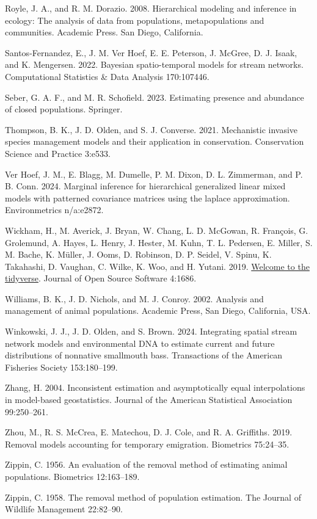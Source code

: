 \documentclass[
  11pt,
  a4paper,
]{article}
\newlength{\cslhangindent}
\newenvironment{CSLReferences}[2] %
 {\begin{list}{}{%
  \setlength{\itemindent}{0pt}
  \setlength{\leftmargin}{0pt}
  \setlength{\parsep}{0pt}
  \ifodd #1
   \setlength{\leftmargin}{\cslhangindent}
   \setlength{\itemindent}{-1\cslhangindent}
  \fi
  \setlength{\itemsep}{#2\baselineskip}}}
 {\end{list}}
\begin{document}
\begin{CSLReferences}{1}{0}
Royle, J. A., and R. M. Dorazio. 2008. Hierarchical modeling and inference in ecology: The analysis of data from populations, metapopulations and communities. Academic Press. San Diego, California.

Santos-Fernandez, E., J. M. Ver Hoef, E. E. Peterson, J. McGree, D. J. Isaak, and K. Mengersen. 2022. Bayesian spatio-temporal models for stream networks. Computational Statistics \& Data Analysis 170:107446.

Seber, G. A. F., and M. R. Schofield. 2023. Estimating presence and abundance of closed populations. Springer.

Thompson, B. K., J. D. Olden, and S. J. Converse. 2021. Mechanistic invasive species management models and their application in conservation. Conservation Science and Practice 3:e533.

Ver Hoef, J. M., E. Blagg, M. Dumelle, P. M. Dixon, D. L. Zimmerman, and P. B. Conn. 2024. Marginal inference for hierarchical generalized linear mixed models with patterned covariance matrices using the laplace approximation. Environmetrics n/a:e2872.

Wickham, H., M. Averick, J. Bryan, W. Chang, L. D. McGowan, R. François, G. Grolemund, A. Hayes, L. Henry, J. Hester, M. Kuhn, T. L. Pedersen, E. Miller, S. M. Bache, K. Müller, J. Ooms, D. Robinson, D. P. Seidel, V. Spinu, K. Takahashi, D. Vaughan, C. Wilke, K. Woo, and H. Yutani. 2019. \href{https://doi.org/10.21105/joss.01686}{Welcome to the {tidyverse}}. Journal of Open Source Software 4:1686.

Williams, B. K., J. D. Nichols, and M. J. Conroy. 2002. Analysis and management of animal populations. Academic Press, San Diego, California, USA.

Winkowski, J. J., J. D. Olden, and S. Brown. 2024. Integrating spatial stream network models and environmental DNA to estimate current and future distributions of nonnative smallmouth bass. Transactions of the American Fisheries Society 153:180--199.

Zhang, H. 2004. Inconsistent estimation and asymptotically equal interpolations in model-based geostatistics. Journal of the American Statistical Association 99:250--261.

Zhou, M., R. S. McCrea, E. Matechou, D. J. Cole, and R. A. Griffiths. 2019. Removal models accounting for temporary emigration. Biometrics 75:24--35.

Zippin, C. 1956. An evaluation of the removal method of estimating animal populations. Biometrics 12:163--189.

Zippin, C. 1958. The removal method of population estimation. The Journal of Wildlife Management 22:82--90.

\end{CSLReferences}
\end{document}
